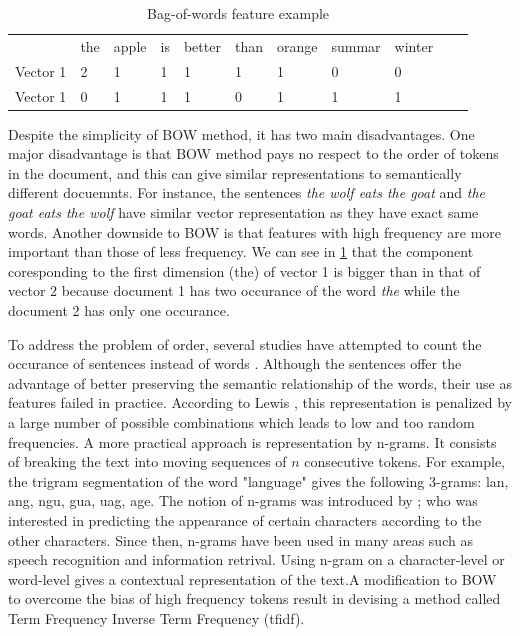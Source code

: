 \begin{table}
\centering
\caption {Bag-of-words feature example}
\begin{tabular}{l|l|l|l|l|l|l|l|l|l|l}
 & the & apple & is & better & than & orange & summar & winter \\
Vector 1 & 2 & 1 & 1 & 1 & 1 & 1 & 0 & 0 \\
Vector 1 & 0 & 1 & 1 & 1 & 0 & 1 & 1 & 1 \\
\end{tabular}
\label {tb:bow}
\end{table}


Despite the simplicity of BOW method,  it has two main disadvantages. One major disadvantage is that BOW method pays no respect to the order of tokens in the document, and this can give similar representations to semantically different docuemnts. For instance, the sentences \emph{the wolf eats the goat} and \emph{the goat eats the wolf} have similar vector representation as they have exact same words. Another downside to BOW is that features with high frequency are more important than those of less frequency. We can see in \ref{tb:bow} that the component coresponding to the first dimension (the) of vector 1 is bigger than in that of vector 2 because document 1 has two occurance of the word \emph{the} while the document 2 has only one occurance. 

To address the problem of order, several studies have attempted to count the occurance of sentences instead of words \citep{fuhr1991probabilistic} \citep{tzeras1993automatic}. Although the sentences offer the advantage of better preserving the semantic relationship of the words, their use as features failed in practice. According to Lewis \citep{lewis1992representation}, this representation is penalized by a large number of possible combinations which leads to low and too
random frequencies. A more practical approach is representation by n-grams. It consists of breaking the text into moving sequences of $n$ consecutive tokens. For example, the trigram segmentation of the word "language" gives the following 3-grams: lan, ang, ngu, gua, uag, age. The notion of n-grams was introduced by  \citep{shannon1948mathematical}; who was interested in predicting the appearance of certain characters according to the other characters. Since then, n-grams have been used in many areas such as speech recognition and information retrival. Using n-gram on a character-level or word-level gives a contextual representation of the text.A modification to BOW to overcome the bias of high frequency tokens result in devising a method called Term Frequency Inverse Term Frequency (tfidf). 

